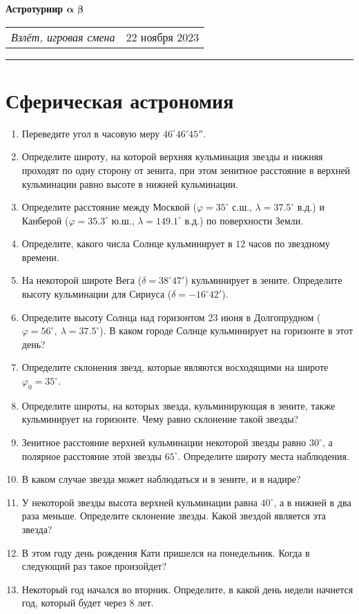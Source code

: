 \documentclass[11pt]{article}
\begin{document}
\begin{center}
	\textbf{\LARGE{Астротурнир $\mathbf{\alpha}$ $\mathbf{\beta}$}}
\end{center}
\begin{tabularx}{\textwidth}{Xr}
	{\textit{Взлёт, игровая смена}} & $22$ ноября $2023$ \\
\end{tabularx}

\noindent\rule{\textwidth}{0.4pt}

\section*{Сферическая астрономия}
\begin{enumerate}
	\item Переведите угол в часовую меру $46^{\circ} 46' 45''$.
    \item Определите широту, на которой верхняя кульминация звезды и нижняя проходят по одну сторону от зенита, при этом зенитное расстояние в верхней кульминации равно высоте в нижней кульминации.
    \item Определите расстояние между Москвой ($\varphi = 35^{\circ}$ с.ш., $\lambda = 37.5^{\circ}$ в.д.) и Канберой ($\varphi = 35.3^{\circ}$ ю.ш., $\lambda = 149.1^{\circ}$ в.д.) по поверхности Земли.
    \item Определите, какого числа Солнце кульминирует в $12$ часов по звездному времени.
    \item На некоторой широте Вега ($\delta = 38^{\circ} 47'$) кульминирует в зените. Определите высоту кульминации для Сириуса ($\delta = -16^{\circ} 42'$).
    \item Определите высоту Солнца над горизонтом 23 июня в Долгопрудном ($\varphi = 56^{\circ},~\lambda = 37.5^{\circ}$). В каком городе Солнце кульминирует на горизонте в этот день?
    \item Определите склонения звезд, которые являются восходящими на широте $\varphi_0 = 35^{\circ}$.
    \item Определите широты, на которых звезда, кульминирующая в зените, также кульминирует на горизонте. Чему равно склонение такой звезды?
    \item Зенитное расстояние верхней кульминации некоторой звезды равно $30^{\circ}$, а полярное расстояние этой звезды $65^{\circ}$. Определите широту места наблюдения.
    \item В каком случае звезда может наблюдаться и в зените, и в надире?
    \item У некоторой звезды высота верхней кульминации равна $40^{\circ}$, а в нижней в два раза меньше. Определите склонение звезды. Какой звездой является эта звезда?
    \item В этом году день рождения Кати пришелся на понедельник. Когда в следующий раз такое произойдет?
    \item Некоторый год начался во вторник. Определите, в какой день недели начнется год, который будет через $8$ лет.
\end{enumerate}
\end{document}
